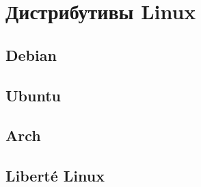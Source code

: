 \chapter{Дистрибутивы Linux}
\section{Debian}
\section{Ubuntu}
\section{Arch}
\section{Liberté Linux}